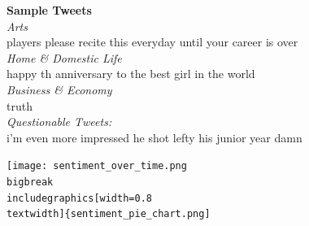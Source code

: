 \documentclass[12pt]{article}
\begin{document}
\textbf{Sample Tweets}\\
\bigbreak
\noindent \large \textit{Arts}\\
players please recite this everyday until your career is over  \\
\smallbreak
\noindent \large \textit{Home & Domestic Life}\\
happy th anniversary to the best girl in the world  \\
\smallbreak
\noindent \large \textit{Business & Economy}\\
truth \\
\smallbreak
\noindent \textit{Questionable Tweets:}\\
i'm even more impressed he shot lefty his junior year damn  \\
\newpage
\begin{center}
\texttt{[image: sentiment\_over\_time.png
\\bigbreak
\\includegraphics[width=0.8 \\textwidth]\{sentiment\_pie\_chart.png]}\\
\end{center}
\end{document}
